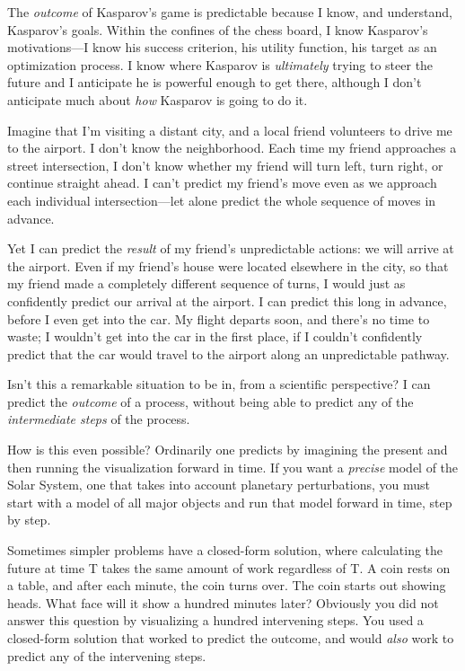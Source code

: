 {
 The \textit{outcome} of Kasparov's game is
predictable because I know, and understand, Kasparov's
goals. Within the confines of the chess board, I know
Kasparov's motivations---I know his success criterion,
his utility function, his target as an optimization process. I know
where Kasparov is \textit{ultimately} trying to steer the future and I
anticipate he is powerful enough to get there, although I
don't anticipate much about \textit{how} Kasparov is
going to do it.}

{
 Imagine that I'm visiting a distant city, and a
local friend volunteers to drive me to the airport. I
don't know the neighborhood. Each time my friend
approaches a street intersection, I don't know whether
my friend will turn left, turn right, or continue straight ahead. I
can't predict my friend's move even as
we approach each individual intersection---let alone predict the whole
sequence of moves in advance.}

{
 Yet I can predict the \textit{result} of my
friend's unpredictable actions: we will arrive at the
airport. Even if my friend's house were located
elsewhere in the city, so that my friend made a completely different
sequence of turns, I would just as confidently predict our arrival at
the airport. I can predict this long in advance, before I even get into
the car. My flight departs soon, and there's no time to
waste; I wouldn't get into the car in the first place,
if I couldn't confidently predict that the car would
travel to the airport along an unpredictable pathway.}

{
 Isn't this a remarkable situation to be in, from a
scientific perspective? I can predict the \textit{outcome} of a
process, without being able to predict any of the \textit{intermediate
steps} of the process.}

{
 How is this even possible? Ordinarily one predicts by imagining
the present and then running the visualization forward in time. If you
want a \textit{precise} model of the Solar System, one that takes into
account planetary perturbations, you must start with a model of all
major objects and run that model forward in time, step by step.}

{
 Sometimes simpler problems have a closed-form solution, where
calculating the future at time T takes the same amount of work
regardless of T. A coin rests on a table, and after each minute, the
coin turns over. The coin starts out showing heads. What face will it
show a hundred minutes later? Obviously you did not answer this
question by visualizing a hundred intervening steps. You used a
closed-form solution that worked to predict the outcome, and would
\textit{also} work to predict any of the intervening steps.}

